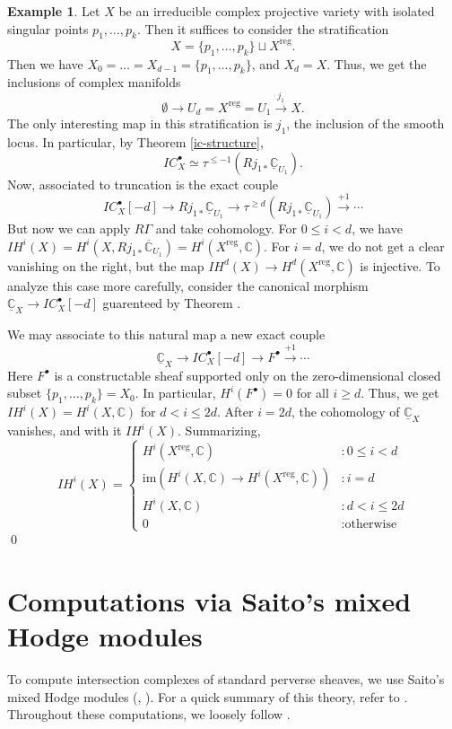 \documentclass[12pt]{amsart}
\newcommand{\C}{\mathbb{C}}
\theoremstyle{definition}
\newtheorem{example}[theorem]{Example}
\theoremstyle{remark}
\numberwithin{equation}{section}
\begin{document}
\begin{example}
Let $X$ be an irreducible complex projective variety with isolated singular points $p_1,\dots, p_k$. Then it suffices to consider the stratification
\[ X = \{p_1,\dots,p_k\} \sqcup X^{\text{reg}}. \]
Then we have \(X_0 = \dots = X_{d-1} = \{p_1,\dots, p_k\}\), and \(X_d = X\). Thus, we get the inclusions of complex manifolds
\[ \emptyset \to U_d = X^{\text{reg}} = U_1 \overset{j_1}{\to} X.\]
The only interesting map in this stratification is $j_1$, the inclusion of the smooth locus. In particular, by Theorem \ref{ic-structure},
\[ IC_X^\bullet \simeq \tau^{\leq -1}\left(Rj_{1*} \underline{\C}_{U_1}\right). \] 
Now, associated to truncation is the exact couple
\begin{equation}
    IC_X^\bullet[-d] \to Rj_{1*} \underline{\C}_{U_1} \to 
    \tau^{\geq d}\left(Rj_{1*} \underline{\C}_{U_1}\right) \overset{+1}{\to} \cdots
\end{equation}
But now we can apply $R\Gamma$ and take cohomology. For $0 \leq i < d$, we have
\( IH^i(X) = H^i(X, Rj_{1*}\overline{\C}_{U_1}) = H^i(X^{\text{reg}}, \C). \) For $i=d$, we do not get a clear vanishing on the right, but the map
\(IH^d(X) \to H^d(X^{\text{reg}}, \C)\) is injective. To analyze this case more carefully, consider the canonical morphism
\( \underline{\C}_X \to IC_X^\bullet[-d] \)
guarenteed by Theorem .

We may associate to this natural map a new exact couple
\begin{equation}
    \underline{\C}_X \to IC_X^\bullet[-d] \to F^\bullet \overset{+1}{\to} \cdots
\end{equation}
Here \(F^\bullet\) is a constructable sheaf supported only on the zero-dimensional closed subset $\{p_1, \dots, p_k\} = X_0$. In particular, \(H^i(F^\bullet) = 0\) for all $i \geq d$. Thus, we get \(IH^i(X) = H^i(X, \C)\) for $d < i \leq 2d$. After $i = 2d$, the cohomology of $\underline{\C}_X$ vanishes, and with it $IH^i(X)$. Summarizing,
\begin{equation}
    IH^i(X) = \begin{cases}
        H^i(X^{\text{reg}}, \C) & : 0 \leq i < d \\
        \text{im}(H^i(X, \C) \to H^i(X^{\text{reg}}, \C)) & : i = d \\
        H^i(X, \C) & : d < i \leq 2d \\
        0 & : \text{otherwise}
    \end{cases}
\end{equation}
\qed
\end{example}


\section{Computations via Saito's mixed Hodge modules}
To compute intersection complexes of standard perverse sheaves, we use Saito's 
mixed Hodge modules (\cite{saito88-HM}, \cite{saito90-MHM}). For a quick summary of 
this theory, refer to \cite[\S 2.1]{deC-Rap-Sac21}. Throughout these computations,
we loosely follow \cite[\S 2]{deC-Mig09}.








\end{document}
